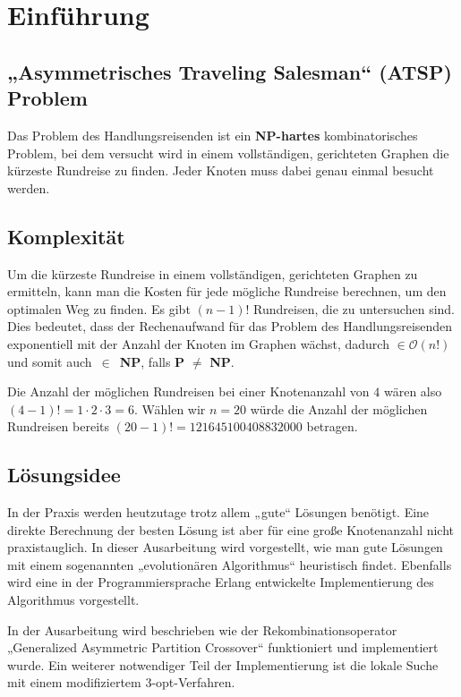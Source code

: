 \chapter{Einführung}
\section{„Asymmetrisches Traveling Salesman“ (ATSP) Problem}
Das Problem des Handlungsreisenden ist ein
\textbf{NP-hartes}\cite{exakte_algo} kombinatorisches Problem, bei dem versucht wird in
einem vollständigen, gerichteten Graphen die kürzeste Rundreise zu
finden. Jeder Knoten muss dabei genau einmal besucht werden.

\section{Komplexität}
Um die kürzeste Rundreise in einem vollständigen, gerichteten Graphen zu
ermitteln, kann man die Kosten für jede mögliche Rundreise berechnen,
um den optimalen Weg zu finden. Es gibt $(n-1)!$ Rundreisen, die zu
untersuchen sind. Dies bedeutet, dass der Rechenaufwand für das Problem 
des Handlungsreisenden exponentiell mit der Anzahl der Knoten im Graphen
wächst, dadurch $\in 
\mathcal{O}(n!)$ und somit auch~$\in$~\textbf{NP}, falls 
\textbf{P} $\neq$ \textbf{NP}.
\begin{bem}
Die Anzahl der möglichen Rundreisen bei einer Knotenanzahl von $4$ wären also
$(4-1)! = 1 \cdot 2 \cdot 3 = 6$. Wählen wir $n = 20$ würde die
Anzahl der möglichen Rundreisen bereits $(20-1)! =
121645100408832000$ betragen.
\end{bem}

\section{Lösungsidee}
In der Praxis werden heutzutage trotz allem „gute“ Lösungen benötigt.
Eine direkte Berechnung der besten Lösung ist aber für eine große
Knotenanzahl nicht praxistauglich. In dieser Ausarbeitung wird
vorgestellt, wie man gute Lösungen mit einem sogenannten „evolutionären
Algorithmus“ heuristisch findet. Ebenfalls wird eine in der
Programmiersprache Erlang entwickelte Implementierung des Algorithmus 
vorgestellt.

In der Ausarbeitung wird beschrieben wie der Rekombinationsoperator
„Generalized Asymmetric Partition Crossover“ funktioniert und
implementiert wurde.
Ein weiterer notwendiger Teil der Implementierung ist die lokale Suche
mit einem modifiziertem 3-opt-Verfahren.
